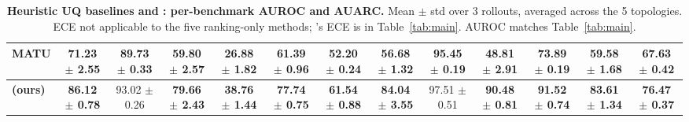 \begin{table}[!t]
{\begin{tabular}{l c c c c c c c c c c c c}
MATU               & 71.23 {\scriptsize $\pm$ 2.55} & 89.73 {\scriptsize $\pm$ 0.33} & 59.80 {\scriptsize $\pm$ 2.57} & 26.88 {\scriptsize $\pm$ 1.82} & 61.39 {\scriptsize $\pm$ 0.96} & 52.20 {\scriptsize $\pm$ 0.24} & 56.68 {\scriptsize $\pm$ 1.32} & 95.45 {\scriptsize $\pm$ 0.19} & 48.81 {\scriptsize $\pm$ 2.91} & 73.89 {\scriptsize $\pm$ 0.19} & 59.58 {\scriptsize $\pm$ 1.68} & 67.63 {\scriptsize $\pm$ 0.42} \\
\midrule
\rowcolor[RGB]{222,230,241}
\textbf{\methodname{} (ours)}
                   & \textbf{86.12 {\scriptsize $\pm$ 0.78}} & 93.02 {\scriptsize $\pm$ 0.26}
                   & \textbf{79.66 {\scriptsize $\pm$ 2.43}} & \textbf{38.76 {\scriptsize $\pm$ 1.44}}
                   & \textbf{77.74 {\scriptsize $\pm$ 0.75}} & \textbf{61.54 {\scriptsize $\pm$ 0.88}}
                   & \textbf{84.04 {\scriptsize $\pm$ 3.55}} & 97.51 {\scriptsize $\pm$ 0.51}
                   & \textbf{90.48 {\scriptsize $\pm$ 0.81}} & \textbf{91.52 {\scriptsize $\pm$ 0.74}}
                   & \textbf{83.61 {\scriptsize $\pm$ 1.34}} & \textbf{76.47 {\scriptsize $\pm$ 0.37}} \\
\bottomrule
\end{tabular}%
}
\caption{\textbf{Heuristic UQ baselines and \methodname{}: per-benchmark
AUROC and AUARC.} Mean $\pm$ std over 3 rollouts, averaged
across the 5 topologies. ECE not applicable to the five
ranking-only methods; \methodname{}'s ECE is in
Table~\ref{tab:main}. \methodname{} AUROC matches
Table~\ref{tab:main}.}
\label{tab:heuristic-uq}
\end{table}
